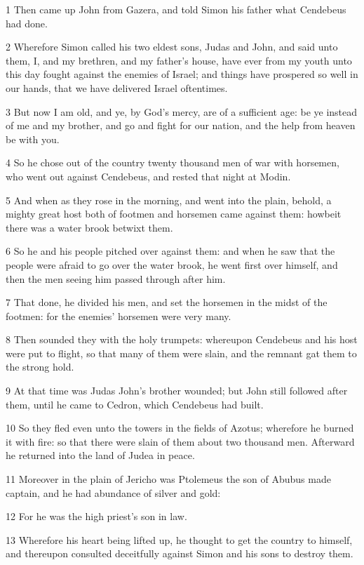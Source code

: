 \par 1 Then came up John from Gazera, and told Simon his father what Cendebeus had done.
\par 2 Wherefore Simon called his two eldest sons, Judas and John, and said unto them, I, and my brethren, and my father's house, have ever from my youth unto this day fought against the enemies of Israel; and things have prospered so well in our hands, that we have delivered Israel oftentimes.
\par 3 But now I am old, and ye, by God's mercy, are of a sufficient age: be ye instead of me and my brother, and go and fight for our nation, and the help from heaven be with you.
\par 4 So he chose out of the country twenty thousand men of war with horsemen, who went out against Cendebeus, and rested that night at Modin.
\par 5 And when as they rose in the morning, and went into the plain, behold, a mighty great host both of footmen and horsemen came against them: howbeit there was a water brook betwixt them.
\par 6 So he and his people pitched over against them: and when he saw that the people were afraid to go over the water brook, he went first over himself, and then the men seeing him passed through after him.
\par 7 That done, he divided his men, and set the horsemen in the midst of the footmen: for the enemies' horsemen were very many.
\par 8 Then sounded they with the holy trumpets: whereupon Cendebeus and his host were put to flight, so that many of them were slain, and the remnant gat them to the strong hold.
\par 9 At that time was Judas John's brother wounded; but John still followed after them, until he came to Cedron, which Cendebeus had built.
\par 10 So they fled even unto the towers in the fields of Azotus; wherefore he burned it with fire: so that there were slain of them about two thousand men. Afterward he returned into the land of Judea in peace.
\par 11 Moreover in the plain of Jericho was Ptolemeus the son of Abubus made captain, and he had abundance of silver and gold:
\par 12 For he was the high priest's son in law.
\par 13 Wherefore his heart being lifted up, he thought to get the country to himself, and thereupon consulted deceitfully against Simon and his sons to destroy them.
